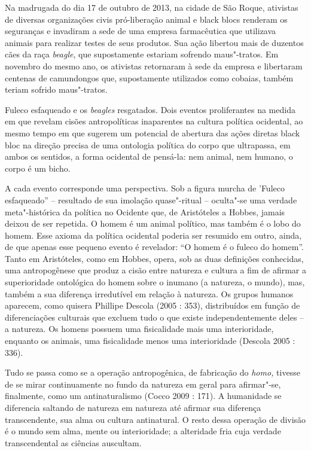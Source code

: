 Na madrugada do dia 17 de outubro de 2013, na cidade de São Roque,
ativistas de diversas organizações civis pró-liberação animal e black
blocs renderam os seguranças e invadiram a sede de uma empresa
farmacêutica que utilizava animais para realizar testes de seus
produtos. Sua ação libertou mais de duzentos cães da raça \emph{beagle},
que supostamente estariam sofrendo maus"-tratos. Em novembro do mesmo
ano, os ativistas retornaram à sede da empresa e libertaram centenas de
camundongos que, supostamente utilizados como cobaias, também teriam
sofrido maus"-tratos.

Fuleco esfaqueado e os \emph{beagles} resgatados. Dois eventos
proliferantes na medida em que revelam cisões antropolíticas inaparentes
na cultura política ocidental, ao mesmo tempo em que sugerem um
potencial de abertura das ações diretas black bloc na direção precisa de
uma ontologia política do corpo que ultrapassa, em ambos os sentidos, a
forma ocidental de pensá-la: nem animal, nem humano, o corpo é um bicho.

A cada evento corresponde uma perspectiva. Sob a figura murcha de
'Fuleco esfaqueado'' -- resultado de sua imolação quase"-ritual --
oculta"-se uma verdade meta"-histórica da política no Ocidente que, de
Aristóteles a Hobbes, jamais deixou de ser repetida. O homem é um animal
político, mas também é o lobo do homem. Esse axioma da política
ocidental poderia ser resumido em outro, ainda, de que apenas esse
pequeno evento é revelador: ``O homem é o fuleco do homem''. Tanto em
Aristóteles, como em Hobbes, opera, sob as duas definições conhecidas,
uma antropogênese que produz a cisão entre natureza e cultura a fim de
afirmar a superioridade ontológica do homem sobre o inumano (a natureza,
o mundo), mas, também a sua diferença irredutível em relação à natureza.
Os grupos humanos aparecem, como quisera Phillipe Descola (2005 : 353),
distribuídos em função de diferenciações culturais que excluem tudo o
que existe independentemente deles -- a natureza. Os homens possuem uma
fisicalidade mais uma interioridade, enquanto os animais, uma
fisicalidade menos uma interioridade (Descola 2005 : 336).

Tudo se passa como se a operação antropogênica, de fabricação do
\emph{homo, }tivesse de se mirar continuamente no fundo da natureza em
geral para afirmar"-se, finalmente, como um antinaturalismo (Cocco 2009 :
171). A humanidade se diferencia saltando de natureza em natureza até
afirmar sua diferença transcendente, sua alma ou cultura antinatural. O
resto dessa operação de divisão é o mundo sem alma, mente ou
interioridade; a alteridade fria cuja verdade transcendental as ciências
auscultam.

